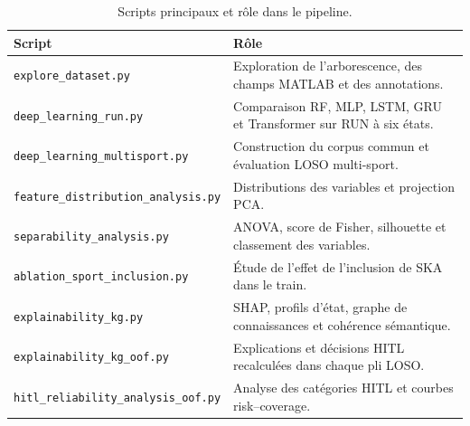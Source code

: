 \documentclass[12pt,a4paper]{article}
\begin{document}
\begin{table}[H]
\centering
\caption{Scripts principaux et rôle dans le pipeline.}
\begin{tabularx}{\linewidth}{lX}
\toprule
\textbf{Script} & \textbf{Rôle} \\
\midrule
\texttt{explore\_dataset.py}
& Exploration de l'arborescence, des champs MATLAB et des annotations. \\

\texttt{deep\_learning\_run.py}
& Comparaison RF, MLP, LSTM, GRU et Transformer sur RUN à six états. \\

\texttt{deep\_learning\_multisport.py}
& Construction du corpus commun et évaluation LOSO multi-sport. \\

\texttt{feature\_distribution\_analysis.py}
& Distributions des variables et projection PCA. \\

\texttt{separability\_analysis.py}
& ANOVA, score de Fisher, silhouette et classement des variables. \\

\texttt{ablation\_sport\_inclusion.py}
& Étude de l'effet de l'inclusion de SKA dans le train. \\

\texttt{explainability\_kg.py}
& SHAP, profils d'état, graphe de connaissances et cohérence sémantique. \\

\texttt{explainability\_kg\_oof.py}
& Explications et décisions HITL recalculées dans chaque pli LOSO. \\

\texttt{hitl\_reliability\_analysis\_oof.py}
& Analyse des catégories HITL et courbes risk--coverage. \\
\bottomrule
\end{tabularx}
\end{table}

\end{document}
